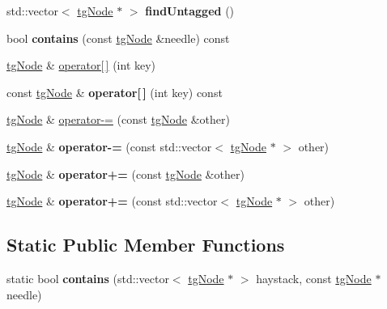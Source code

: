 \begin{DoxyCompactItemize}
\item 
\hypertarget{classtg_taggables_a243be2dc97672c907030d33e9cb2b63f}{std\-::vector$<$ \hyperlink{classtg_node}{tg\-Node} $\ast$ $>$ {\bfseries find\-Untagged} ()}\label{classtg_taggables_a243be2dc97672c907030d33e9cb2b63f}

\item 
\hypertarget{classtg_taggables_a9a70a8d3c5a1a16f74b8850e83d7fbc2}{bool {\bfseries contains} (const \hyperlink{classtg_node}{tg\-Node} \&needle) const}\label{classtg_taggables_a9a70a8d3c5a1a16f74b8850e83d7fbc2}

\item 
\hyperlink{classtg_node}{tg\-Node} \& \hyperlink{classtg_taggables_a6021ba9f018968067c66aea2c595c922}{operator\mbox{[}$\,$\mbox{]}} (int key)
\item 
\hypertarget{classtg_taggables_ad6a35d3c06ea51fdb5c3124057bb85b3}{const \hyperlink{classtg_node}{tg\-Node} \& {\bfseries operator\mbox{[}$\,$\mbox{]}} (int key) const}\label{classtg_taggables_ad6a35d3c06ea51fdb5c3124057bb85b3}

\item 
\hyperlink{classtg_node}{tg\-Node} \& \hyperlink{classtg_taggables_a312aedd035620cd548def65cf680a0b5}{operator-\/=} (const \hyperlink{classtg_node}{tg\-Node} \&other)
\item 
\hypertarget{classtg_taggables_a1aff1aaf061806febdb8e0b230908800}{\hyperlink{classtg_node}{tg\-Node} \& {\bfseries operator-\/=} (const std\-::vector$<$ \hyperlink{classtg_node}{tg\-Node} $\ast$ $>$ other)}\label{classtg_taggables_a1aff1aaf061806febdb8e0b230908800}

\item 
\hypertarget{classtg_taggables_a82b9dee1611abaccf8326d16ab0b68ad}{\hyperlink{classtg_node}{tg\-Node} \& {\bfseries operator+=} (const \hyperlink{classtg_node}{tg\-Node} \&other)}\label{classtg_taggables_a82b9dee1611abaccf8326d16ab0b68ad}

\item 
\hypertarget{classtg_taggables_a268d114ffe7ca1256c7fcc527dfd0bf7}{\hyperlink{classtg_node}{tg\-Node} \& {\bfseries operator+=} (const std\-::vector$<$ \hyperlink{classtg_node}{tg\-Node} $\ast$ $>$ other)}\label{classtg_taggables_a268d114ffe7ca1256c7fcc527dfd0bf7}

\end{DoxyCompactItemize}
\subsection*{Static Public Member Functions}
\begin{DoxyCompactItemize}
\item 
\hypertarget{classtg_taggables_ae0c1c79f02a785019b037842b056cac1}{static bool {\bfseries contains} (std\-::vector$<$ \hyperlink{classtg_node}{tg\-Node} $\ast$ $>$ haystack, const \hyperlink{classtg_node}{tg\-Node} $\ast$needle)}\label{classtg_taggables_ae0c1c79f02a785019b037842b056cac1}

\end{DoxyCompactItemize}
